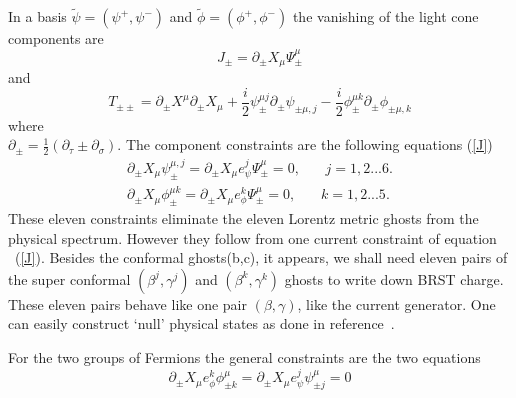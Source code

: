 \documentclass[a4paper,showpacs,preprintnumbers,amsmath,amssymb]{revtex4}
\begin{document}
In a basis $\tilde {\psi}=(\psi^+,\psi^-)$ and $\tilde {\phi}=(\phi^+,\phi^-)$
the vanishing of the light cone components are
\begin{equation}
J_{\pm}=\partial_{\pm}X_{\mu}\Psi^{\mu}_{\pm}\label{J}
\end{equation}
and
\begin{equation}
T_{\pm\pm}=
\partial_{\pm}X^{\mu}\partial_{\pm}X_{\mu}+\frac{i}{ 2}{\psi}^{\mu j}_{\pm}\partial_{\pm}
 \psi_{\pm\mu,j }- \frac{i}{2}{\phi}_{\pm}^{\mu k}\partial_{\pm}\phi_{\pm\mu,k}
\end{equation}
where\\
$\partial_{\pm}=\frac{1}{2}(\partial_{\tau} \pm\partial_{\sigma})$. The component constraints
are the following equations (\ref{J})
\begin{eqnarray}
\partial_{\pm}X_{\mu}\psi_{\pm}^{\mu,j} = \partial_{\pm}X_{\mu}
e^j_{\psi}\Psi^{\mu}_{\pm }=0,~~~~~~~~j=1,2...6.\\ 
\partial_{\pm}X_{\mu}\phi_{\pm}^{\mu k} = \partial_{\pm}X_{\mu}e^k_{\phi}\Psi^{\mu}
_{\pm }=0,~~~~~~~~k=1,2...5.
\end{eqnarray}
These eleven constraints eliminate the eleven Lorentz metric ghosts 
from the physical spectrum. However they follow from one current constraint of equation
~(\ref{J}). Besides the conformal ghosts(b,c), it appears, we shall need eleven pairs of the
super conformal $(\beta^j, \gamma^j)$  and $(\beta^k, \gamma^k)$ ghosts to write down
BRST charge. These eleven pairs behave like one pair $(\beta, \gamma)$, like the current 
generator. One can easily construct `null' physical states as done in reference~\cite{gr}. 

For the two groups of Fermions the general constraints 
are the two equations
\begin{equation}
\partial_{\pm}X_{\mu}e^k_{\phi}\phi^{\mu}_{\pm k} = \partial_{\pm}X_{\mu}
e^j_{\psi}\psi^{\mu}_{\pm j}=0\label{5}
\end{equation}
\end{document}
